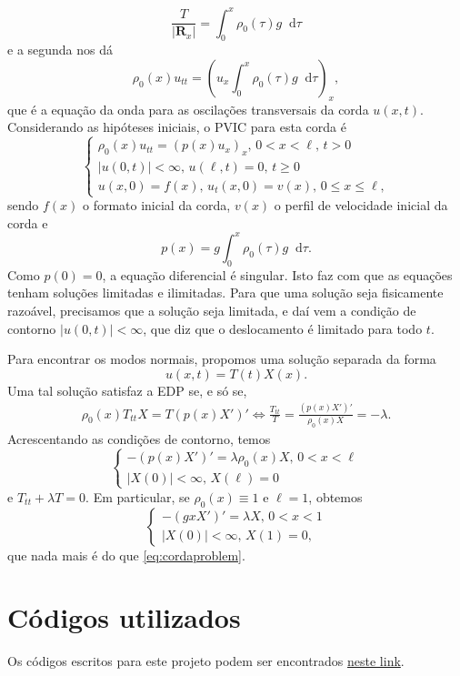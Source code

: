 \documentclass[twocolumn,showpacs,%
  nofootinbib,aps,superscriptaddress,%
  eqsecnum,prd,notitlepage,showkeys,10pt]{revtex4-1}
\newcommand*\diff{\mathop{}\!\mathrm{d}}
\renewcommand{\leq}{\leqslant}
\renewcommand{\geq}{\geqslant}
\begin{document}
%
\[
    \frac{T}{|\mathbf{R}_x|} = \int_0^x \rho_0(\tau) g \diff\tau
\]
%
e a segunda nos dá
%
\[
    \rho_0(x)u_{tt} = \left( u_x\int_0^x \rho_0(\tau) g \diff\tau \right)_x,
\]
%
que é a equação da onda para as oscilações transversais da corda $u(x,t)$.
Considerando as hipóteses iniciais, o PVIC para esta corda é
%
\[
    \left\{
        \begin{array}{l}
            \rho_0(x) u_{tt} = (p(x)u_x)_x, \, 0 < x < \ell, \, t > 0 \\ 
            |u(0,t)| < \infty, \, u(\ell, t) = 0, \, t\geq 0 \\ 
            u(x,0) = f(x), \, u_t(x,0) = v(x), \, 0 \leq x \leq \ell,
        \end{array}
    \right.
\]
%
sendo $f(x)$ o formato inicial da corda, $v(x)$ o perfil de velocidade inicial da corda
e
%
\[
    p(x) = g\int_0^x \rho_0(\tau) g \diff\tau.
\]
%
Como $p(0) = 0$, a equação diferencial é singular. Isto faz com que as equações
tenham soluções limitadas e ilimitadas. Para que uma solução seja fisicamente
razoável, precisamos que a solução seja limitada, e daí vem a condição de contorno
$|u(0,t)| < \infty$, que diz que o deslocamento é limitado para todo $t$.

Para encontrar os modos normais, propomos uma solução separada da forma
%
\[
    u(x,t) = T(t)X(x).
\]
%
Uma tal solução satisfaz a EDP se, e só se,
%
\begin{align*}
    \rho_0(x)T_{tt}X = T(p(x)X')' \iff
    \frac{T_{tt}}{T} = \frac{(p(x) X')'}{\rho_0(x) X} = -\lambda.
\end{align*}
%
Acrescentando as condições de contorno, temos
%
\[
    \left\{
        \begin{array}{l}
            -(p(x)X')' = \lambda\rho_0(x)X, \, 0 < x < \ell \\ 
            |X(0)| < \infty, \, X(\ell) = 0
        \end{array}
    \right.
\]
%
e $T_{tt} + \lambda T = 0$. Em particular, se $\rho_0(x) \equiv 1$ e $\ell = 1$, obtemos
%
\[
    \left\{
        \begin{array}{l}
            -(gxX')' = \lambda X, \, 0 < x < 1 \\ 
            |X(0)| < \infty, \, X(1) = 0,
        \end{array}
    \right.
\]
%
que nada mais é do que \eqref{eq:cordaproblem}.

%
\section{Códigos utilizados}
%
Os códigos escritos para este projeto podem ser encontrados 
\href{https://github.com/CaioTomas/Trabalho-final----IMCEDO}{neste link}.
\end{document}
